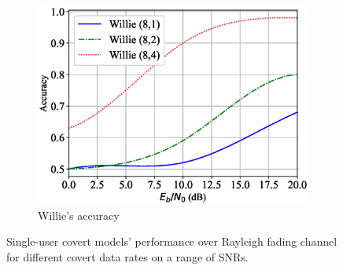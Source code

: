 \begin{figure}[tp!]
\begin{subfigure}{0.28\textwidth}
		\includegraphics[width=\linewidth]{figs/willie_accuracy_rayleigh}
		\caption{Willie's accuracy}
		\label{fig:rayleigh_resutls_willie}
	\end{subfigure}
	\caption{Single-user covert models' performance over Rayleigh fading channel for different covert data rates on a range of SNRs.}
	\label{fig:rayleigh_resutls}
\end{figure}
